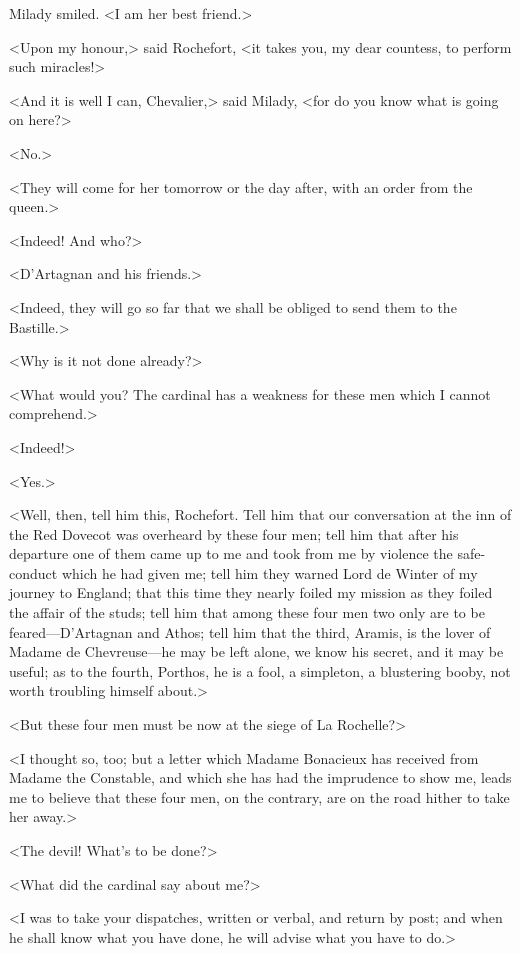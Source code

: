 Milady smiled. <I am her best friend.> 

<Upon my honour,> said Rochefort, <it takes you, my dear countess, to perform such miracles!> 

<And it is well I can, Chevalier,> said Milady, <for do you know what is going on here?> 

<No.> 

<They will come for her tomorrow or the day after, with an order from the queen.> 

<Indeed! And who?> 

<D'Artagnan and his friends.> 

<Indeed, they will go so far that we shall be obliged to send them to the Bastille.> 

<Why is it not done already?> 

<What would you? The cardinal has a weakness for these men which I cannot comprehend.> 

<Indeed!> 

<Yes.> 

<Well, then, tell him this, Rochefort. Tell him that our conversation at the inn of the Red Dovecot was overheard by these four men; tell him that after his departure one of them came up to me and took from me by violence the safe-conduct which he had given me; tell him they warned Lord de Winter of my journey to England; that this time they nearly foiled my mission as they foiled the affair of the studs; tell him that among these four men two only are to be feared---D'Artagnan and Athos; tell him that the third, Aramis, is the lover of Madame de Chevreuse---he may be left alone, we know his secret, and it may be useful; as to the fourth, Porthos, he is a fool, a simpleton, a blustering booby, not worth troubling himself about.> 

<But these four men must be now at the siege of La Rochelle?> 

<I thought so, too; but a letter which Madame Bonacieux has received from Madame the Constable, and which she has had the imprudence to show me, leads me to believe that these four men, on the contrary, are on the road hither to take her away.> 

<The devil! What's to be done?> 

<What did the cardinal say about me?> 

<I was to take your dispatches, written or verbal, and return by post; and when he shall know what you have done, he will advise what you have to do.> 

